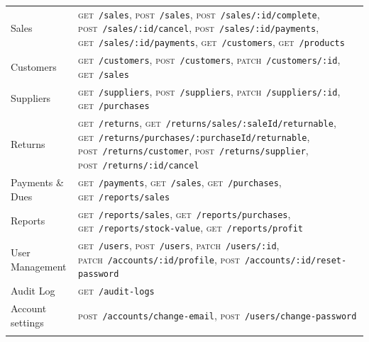 \documentclass[11pt,a4paper]{article}
\newcommand{\code}[1]{\texttt{#1}}
\begin{document}
\begin{longtable}{@{}P{3.1cm}P{11.9cm}@{}}
Sales & {\raggedright \textsc{get}~\code{/\allowbreak{}sales}, \textsc{post}~\code{/\allowbreak{}sales}, \textsc{post}~\code{/\allowbreak{}sales/\allowbreak{}:id/\allowbreak{}complete}, \textsc{post}~\code{/\allowbreak{}sales/\allowbreak{}:id/\allowbreak{}cancel}, \textsc{post}~\code{/\allowbreak{}sales/\allowbreak{}:id/\allowbreak{}payments}, \textsc{get}~\code{/\allowbreak{}sales/\allowbreak{}:id/\allowbreak{}payments}, \textsc{get}~\code{/\allowbreak{}customers}, \textsc{get}~\code{/\allowbreak{}products}} \\\addlinespace
Customers & {\raggedright \textsc{get}~\code{/\allowbreak{}customers}, \textsc{post}~\code{/\allowbreak{}customers}, \textsc{patch}~\code{/\allowbreak{}customers/\allowbreak{}:id}, \textsc{get}~\code{/\allowbreak{}sales}} \\\addlinespace
Suppliers & {\raggedright \textsc{get}~\code{/\allowbreak{}suppliers}, \textsc{post}~\code{/\allowbreak{}suppliers}, \textsc{patch}~\code{/\allowbreak{}suppliers/\allowbreak{}:id}, \textsc{get}~\code{/\allowbreak{}purchases}} \\\addlinespace
Returns & {\raggedright \textsc{get}~\code{/\allowbreak{}returns}, \textsc{get}~\code{/\allowbreak{}returns/\allowbreak{}sales/\allowbreak{}:saleId/\allowbreak{}returnable}, \textsc{get}~\code{/\allowbreak{}returns/\allowbreak{}purchases/\allowbreak{}:purchaseId/\allowbreak{}returnable}, \textsc{post}~\code{/\allowbreak{}returns/\allowbreak{}customer}, \textsc{post}~\code{/\allowbreak{}returns/\allowbreak{}supplier}, \textsc{post}~\code{/\allowbreak{}returns/\allowbreak{}:id/\allowbreak{}cancel}} \\\addlinespace
Payments \& Dues & {\raggedright \textsc{get}~\code{/\allowbreak{}payments}, \textsc{get}~\code{/\allowbreak{}sales}, \textsc{get}~\code{/\allowbreak{}purchases}, \textsc{get}~\code{/\allowbreak{}reports/\allowbreak{}sales}} \\\addlinespace
Reports & {\raggedright \textsc{get}~\code{/\allowbreak{}reports/\allowbreak{}sales}, \textsc{get}~\code{/\allowbreak{}reports/\allowbreak{}purchases}, \textsc{get}~\code{/\allowbreak{}reports/\allowbreak{}stock-value}, \textsc{get}~\code{/\allowbreak{}reports/\allowbreak{}profit}} \\\addlinespace
User Management & {\raggedright \textsc{get}~\code{/\allowbreak{}users}, \textsc{post}~\code{/\allowbreak{}users}, \textsc{patch}~\code{/\allowbreak{}users/\allowbreak{}:id}, \textsc{patch}~\code{/\allowbreak{}accounts/\allowbreak{}:id/\allowbreak{}profile}, \textsc{post}~\code{/\allowbreak{}accounts/\allowbreak{}:id/\allowbreak{}reset-password}} \\\addlinespace
Audit Log & {\raggedright \textsc{get}~\code{/\allowbreak{}audit-logs}} \\\addlinespace
Account settings & {\raggedright \textsc{post}~\code{/\allowbreak{}accounts/\allowbreak{}change-email}, \textsc{post}~\code{/\allowbreak{}users/\allowbreak{}change-password}} \\\addlinespace
\bottomrule
\end{longtable}
\end{document}
